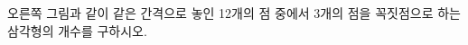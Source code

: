 \noindent\begin{minipage}[t]{0.58\linewidth}\vspace{0pt}\raggedright 오른쪽 그림과 같이 같은 간격으로 놓인 12개의 점 중에서 3개의 점을 꼭짓점으로 하는 삼각형의 개수를 구하시오. \end{minipage}\hfill\begin{minipage}[t]{0.4\linewidth}\vspace{0pt}\centering \resizebox{\ifdim\width>\linewidth\linewidth\else\width\fi}{!}{}\end{minipage}\par
